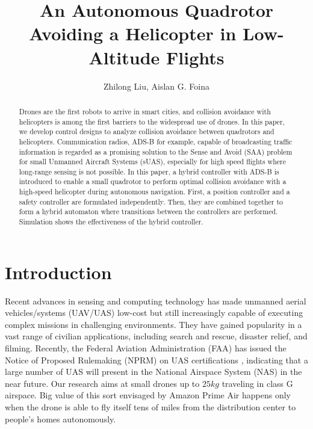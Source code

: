 \documentclass[journal,11pt,onecolumn,draftclsnofoot,]{IEEEtran}
\begin{document}
\title{An Autonomous Quadrotor Avoiding a Helicopter in Low-Altitude Flights}

\author{Zhilong Liu, Aislan G. Foina}


\maketitle
{}

\begin{abstract}
Drones are the first robots to arrive in smart cities, and collision avoidance with helicopters is among the first barriers to the widespread use of drones. In this paper, we develop control designs to analyze collision avoidance between quadrotors and helicopters. Communication radios, ADS-B for example, capable of broadcasting traffic information is regarded as a promising solution to the Sense and Avoid (SAA) problem for small Unmanned Aircraft Systems (sUAS), especially for high speed flights where long-range sensing is not possible. In this paper, a hybrid controller with ADS-B is introduced to enable a small quadrotor to perform optimal collision avoidance with a high-speed helicopter during autonomous navigation. First, a position controller and a safety controller are formulated independently. Then, they are combined together to form a hybrid automaton where transitions between the controllers are performed. Simulation shows the effectiveness of the hybrid controller.

\end{abstract}



\section{\textbf{Introduction}}

Recent advances in sensing and computing technology has made unmanned aerial vehicles/systems (UAV/UAS) low-cost but still increasingly capable of executing complex missions in challenging environments. They have gained popularity in a vast range of civilian applications, including search and rescue, disaster relief, and filming. Recently, the Federal Aviation Administration (FAA) has issued the Notice of Proposed Rulemaking (NPRM) on UAS certifications \cite{faa-nprm}, indicating that a large number of UAS will present in the National Airspace System (NAS) in the near future. Our research aims at small drones up to $25 kg$ traveling in class G airspace. Big value of this sort envisaged by Amazon Prime Air \cite{amazon_whitepaper_safe_access} happens only when the drone is able to fly itself tens of miles from the distribution center to people's homes autonomously. 
\end{document}
